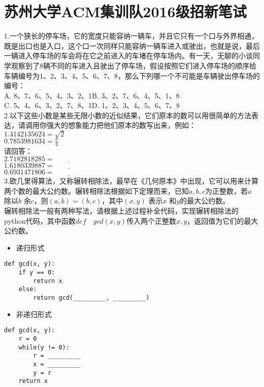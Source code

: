 



\section{苏州大学ACM集训队2016级招新笔试}

\noindent 1.一个狭长的停车场，它的宽度只能容纳一辆车，并且它只有一个口与外界相通，既是出口也是入口，这个口一次同样只能容纳一辆车进入或驶出，也就是说，最后一辆进入停车场的车会将在它之前进入的车堵在停车场内。有一天，无聊的小谈同学观察到了8辆不同的车进入且驶出了停车场，假设按照它们进入停车场的顺序给车辆编号为1、2、3、4、5、6、7、8，那么下列哪一个不可能是车辆驶出停车场的编号：$\underline{\qquad \qquad }$ \\
A. 8、7、6、5、4、3、2、1\qquad  B. 3、2、7、6、4、5、1、8 \\
C. 5、4、6、3、2、7、8、1\qquad  D. 1、2、3、4、5、6、7、8 \\

\noindent 2.以下这些小数是某些无限小数的近似结果，它们原本的数可以用很简单的方法表达，请调用你强大的想象能力把他们原本的数写出来，例如： \\
$1.4142135624=\sqrt {2}$  \\
$0.7853981634=\frac{\pi}{4}$ \\
请回答： \\
$2.7182818285=\underline{\qquad \qquad }$\\
$1.6180339887=\underline{\qquad \qquad }$\\
$0.6931471806=\underline{\qquad \qquad }$\\

\noindent 3.欧几里得算法，又称辗转相除法，最早在《几何原本》中出现，它可以用来计算两个数的最大公约数。辗转相除法根据如下定理而来，已知$a,b,c$为正整数，若$a$ 除以$b$ 余$c$，则$(a,b)=(b,c)$，其中$(x,y)$ 表示$x$ 和$y$的最大公约数。 \\

辗转相除法一般有两种写法，请根据上述过程补全代码，实现辗转相除法的python代码，其中函数$def\quad gcd(x,y)$传入两个正整数$x,y$，返回值为它们的最大公约数。
\begin{itemize}
\item 递归形式
\end{itemize}
\begin{lstlisting}
def gcd(x, y):
    if y == 0:
        return x
    else:
        return gcd(_________, _________)
\end{lstlisting}
\begin{itemize}
\item 非递归形式
\end{itemize}
\begin{lstlisting}
def gcd(x, y):
    r = 0
    while(y != 0):
        r = _________
        x = _________
        y = r
    return x
\end{lstlisting}

